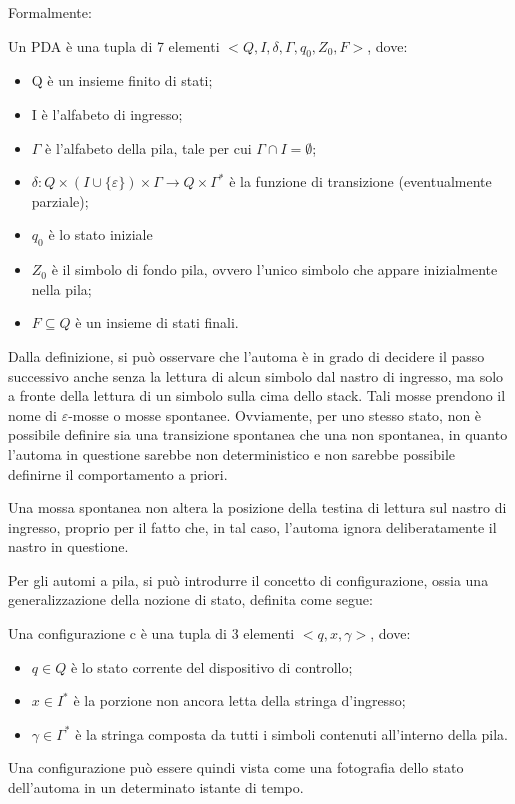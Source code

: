   \break

  \noindent
  Formalmente:
  \begin{definition}
    Un PDA è una tupla di 7 elementi \(<Q, I, \delta, \Gamma, q_0, Z_0, F>\), dove:
    \begin{itemize}
      \item Q è un insieme finito di stati;
      \item I è l'alfabeto di ingresso;
      \item \(\Gamma\) è l'alfabeto della pila, tale per cui \(\Gamma \cap I = \emptyset\);
      \item \(\delta:Q\times (I\cup \{\varepsilon\})\times \Gamma \to Q \times \Gamma^*\) è la funzione di transizione (eventualmente parziale);
      \item \(q_0\) è lo stato iniziale
      \item \(Z_0\) è il simbolo di fondo pila, ovvero l'unico simbolo che appare inizialmente nella pila;
      \item \(F\subseteq Q\) è un insieme di stati finali.
    \end{itemize}
  \end{definition}

  Dalla definizione, si può osservare che l'automa è in grado di decidere il passo successivo anche senza la lettura di alcun simbolo dal nastro di ingresso, ma solo a fronte della lettura di un simbolo sulla cima dello stack. Tali mosse prendono il nome di \(\varepsilon\)-mosse o mosse spontanee. Ovviamente, per uno stesso stato, non è possibile definire sia una transizione spontanea che una non spontanea, in quanto l'automa in questione sarebbe non deterministico e non sarebbe possibile definirne il comportamento a priori. 

  Una mossa spontanea non altera la posizione della testina di lettura sul nastro di ingresso, proprio per il fatto che, in tal caso, l'automa ignora deliberatamente il nastro in questione.

  Per gli automi a pila, si può introdurre il concetto di configurazione, ossia una generalizzazione della nozione di stato, definita come segue:

  \begin{definition}
    Una configurazione c è una tupla di 3 elementi \(<q, x, \gamma>\), dove:
    \begin{itemize}
      \item \(q\in Q\) è lo stato corrente del dispositivo di controllo;
      \item \(x \in I^*\) è la porzione non ancora letta della stringa d'ingresso;
      \item \(\gamma \in \Gamma^*\) è la stringa composta da tutti i simboli contenuti all'interno della pila. 
    \end{itemize}
  \end{definition}
  Una configurazione può essere quindi vista come una fotografia dello stato dell'automa in un determinato istante di tempo. 

